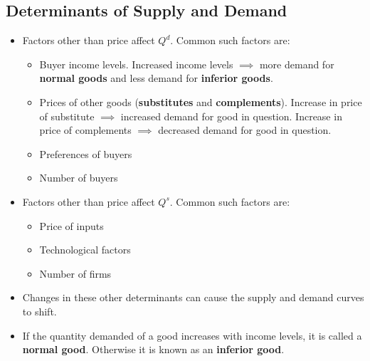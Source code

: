 \documentclass[a4paper]{article}
\begin{document}
\subsection{Determinants of Supply and Demand}
\begin{itemize}
    \item Factors other than price affect $Q^d$. Common such factors are:
    \begin{itemize}
        \item Buyer income levels. Increased income levels $\implies$ more demand for \textbf{normal goods} and less demand for \textbf{inferior goods}.
        \item Prices of other goods (\textbf{substitutes} and \textbf{complements}). Increase in price of substitute $\implies$  increased demand for good in question. Increase in price of complements $\implies$  decreased demand for good in question.
        \item Preferences of buyers
        \item Number of buyers
    \end{itemize}
    \item Factors other than price affect $Q^s$. Common such factors are:
    \begin{itemize}
        \item Price of inputs
        \item Technological factors 
        \item Number of firms
    \end{itemize}
    \item Changes in these other determinants can cause the supply and demand curves to shift.
    \item If the quantity demanded of a good increases with income levels, it is called a \textbf{normal good}. Otherwise it is known as an \textbf{inferior good}. 
\end{itemize}
\end{document}
